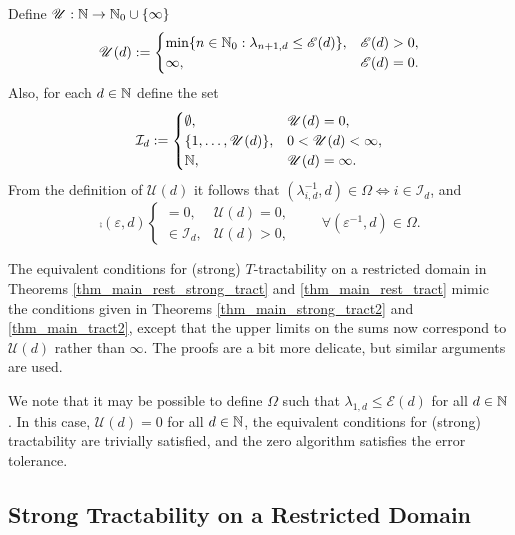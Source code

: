 \documentclass[sort&compress]{elsarticle}
\newcommand{\theM}{\mathscr{E}}
\newcommand{\theUB}{\mathscr{U}}
\renewcommand{\hI}{\mathcal{I}}
\newcommand{\peter}[1]{\begingroup\color{violet}#1\endgroup}
\begin{document}
Define $\theUB: \naturals \to \natzero \cup \{\infty\}$
\begin{equation} \label{eq:Mddef}
    \theUB(d) := \begin{cases}
        \min\{n \in \natzero : \lambda_{n+1,d} \le \theM(d)\}, & \theM(d) > 0, \\
        \infty, & \theM(d) = 0.
    \end{cases}
\end{equation}
Also, for each $d \in \mathbb{N}$ define the set
\begin{equation} \label{eq:hIdef}
\mathcal{I}_d :=\begin{cases}
\emptyset, & \theUB(d) = 0, \\
\{1,\ldots, \theUB(d)\}, & 0 < \theUB(d) < \infty, \\
\naturals, & \theUB(d) = \infty.
\end{cases}
\end{equation}
From the definition of $\theUB(d)$ it follows that $(\lambda_{i,d}^{-1},d) \in \Omega  \iff i \in \hI_d$, and
\begin{equation} \label{eq:comprestr}
  \comp(\varepsilon,d) \begin{cases}
= 0, & \theUB(d) = 0, \\
    \in \hI_d, & \theUB(d) > 0,
\end{cases}
\qquad \forall (\varepsilon^{-1},d) \in \Omega.
\end{equation}


The equivalent conditions for (strong) $T$-tractability on a restricted domain in Theorems \ref{thm_main_rest_strong_tract} and \ref{thm_main_rest_tract} mimic the conditions given in Theorems \ref{thm_main_strong_tract2} and \ref{thm_main_tract2}, except that the upper limits on the sums now correspond to $\theUB(d)$ rather than $\infty$.  The proofs are a bit more delicate, but similar arguments are used.

We note that it may be possible to define $\Omega$ such that  $\lambda_{1,d} \le \theM(d)$
for all $d \in \mathbb{N}$. In this case, $\theUB(d) = 0$ for all $d \in \mathbb{N}$, the equivalent conditions for (strong) tractability are trivially satisfied, and the zero algorithm satisfies the error tolerance.

\subsection{Strong Tractability on a Restricted Domain}
\end{document}
